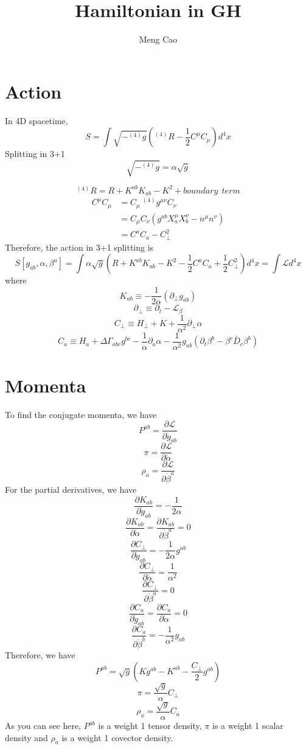 \documentclass{article}
\begin{document}
\title{Hamiltonian in GH}
\author{Meng Cao}
\maketitle

\section{Action}
In 4D spacetime, 
\[
S = \int \sqrt{-^{(4)}g}(^{(4)}R - \frac{1}{2}C^{\mu}C_{\mu}) d^4 x
\]
Splitting in 3+1
\[
\sqrt{-^{(4)}g} = \alpha \sqrt{g}
\]

\[
^{(4)}R = R + K^{ab}K_{ab} - K^2 + boundary~~term
\]
\begin{align*}
C^{\mu}C_{\mu} & = C_{\mu}~^{(4)}g^{\mu\nu}C_{\nu}\\
& = C_{\mu}C_{\nu}(g^{ab}X^{\mu}_{a}X^{\nu}_{b} - n^{\mu}n^{\nu})\\
& = C^{a}C_{a} - C_{\perp}^2
\end{align*}
Therefore, the action in 3+1 splitting is
\[
S[g_{ab},\alpha,\beta^{a}] = \int  \alpha \sqrt{g}(R + K^{ab}K_{ab} - K^{2} - \frac{1}{2} C^{a}C_{a} + \frac{1}{2}C_{\perp}^2) d^{4} x = \int \mathscr{L} d^4 x
\]
where
\[
K_{ab} \equiv -\frac{1}{2\alpha}(\partial_{\perp}g_{ab})
\]
\[
\partial_{\perp} \equiv \partial_{t} - \mathcal{L}_{\beta}
\]
\[
C_{\perp} \equiv H_{\perp} + K + \frac{1}{\alpha^2}\partial_{\perp}\alpha
\]
\[
C_{a} \equiv H_{a} + \Delta \Gamma_{abc}g^{bc} - \frac{1}{\alpha} \partial_{a} \alpha - \frac{1}{\alpha^2}g_{ab}(\partial_{t}\beta^{b} - \beta^{c}{\bar D}_{c}\beta^{b})
\]
\section{Momenta}
To find the conjugate momenta, we have
\[
P^{ab} = \frac{\partial \mathscr{L}}{\partial {\dot g_{ab}}}
\]
\[
\pi = \frac{\partial \mathscr{L}}{\partial {\dot \alpha}}
\]
\[
\rho_{a} = \frac{\partial \mathscr{L}}{\partial {\dot \beta^{a}}}
\]
For the partial derivatives, we have
\[
\frac{\partial K_{ab}}{\partial {\dot g_{ab}}} = -\frac{1}{2\alpha}
\]
\[
\frac{\partial K_{ab}}{\partial {\dot \alpha}} = \frac{\partial K_{ab}}{\partial {\dot \beta^{a}}} = 0
\]
\[
\frac{\partial C_{\perp}}{\partial {\dot g_{ab}}} = -\frac{1}{2\alpha}g^{ab}
\]
\[
\frac{\partial C_{\perp}}{\partial {\dot \alpha}} = \frac{1}{\alpha^2}
\]
\[
\frac{\partial C_{\perp}}{\partial {\dot \beta^{a}}} = 0
\]
\[
\frac{\partial C_{a}}{\partial {\dot g_{ab}}} = \frac{\partial C_{a}}{\partial {\dot \alpha}} = 0
\]
\[
\frac{\partial C_{a}}{\partial {\dot \beta^{b}}} = -\frac{1}{\alpha^2}g_{ab}
\]
Therefore, we have
\[
\boxed{
P^{ab} = \sqrt{g}(Kg^{ab} - K^{ab} - \frac{C_{\perp}}{2}g^{ab})
}
\]
\[
\boxed{
\pi = \frac{\sqrt{g}}{\alpha}C_{\perp}
}
\]
\[
\boxed{
\rho_{a} = \frac{\sqrt{g}}{\alpha}C_{a}
}
\]
As you can see here, $P^{ab}$ is a weight 1 tensor density, $\pi$ is a weight 1 scalar density and $\rho_{a}$ is a weight 1 covector density.  
\end{document}
